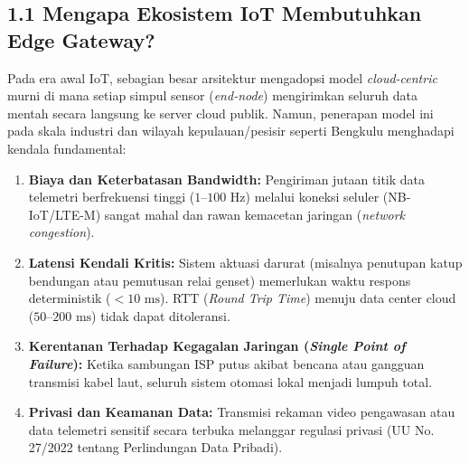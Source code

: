 \documentclass[11pt,a4paper]{article}
\begin{document}
\subsection*{1.1 Mengapa Ekosistem IoT Membutuhkan Edge Gateway?}
Pada era awal IoT, sebagian besar arsitektur mengadopsi model \textit{cloud-centric} murni di mana setiap simpul sensor (\textit{end-node}) mengirimkan seluruh data mentah secara langsung ke server cloud publik. Namun, penerapan model ini pada skala industri dan wilayah kepulauan/pesisir seperti Bengkulu menghadapi kendala fundamental:
\begin{enumerate}
    \item \textbf{Biaya dan Keterbatasan Bandwidth:} Pengiriman jutaan titik data telemetri berfrekuensi tinggi ($1\text{--}100\text{ Hz}$) melalui koneksi seluler (NB-IoT/LTE-M) sangat mahal dan rawan kemacetan jaringan (\textit{network congestion}).
    \item \textbf{Latensi Kendali Kritis:} Sistem aktuasi darurat (misalnya penutupan katup bendungan atau pemutusan relai genset) memerlukan waktu respons deterministik ($<10\text{ ms}$). RTT (\textit{Round Trip Time}) menuju data center cloud ($50\text{--}200\text{ ms}$) tidak dapat ditoleransi.
    \item \textbf{Kerentanan Terhadap Kegagalan Jaringan (\textit{Single Point of Failure}):} Ketika sambungan ISP putus akibat bencana atau gangguan transmisi kabel laut, seluruh sistem otomasi lokal menjadi lumpuh total.
    \item \textbf{Privasi dan Keamanan Data:} Transmisi rekaman video pengawasan atau data telemetri sensitif secara terbuka melanggar regulasi privasi (UU No. 27/2022 tentang Perlindungan Data Pribadi).
\end{enumerate}
\end{document}
